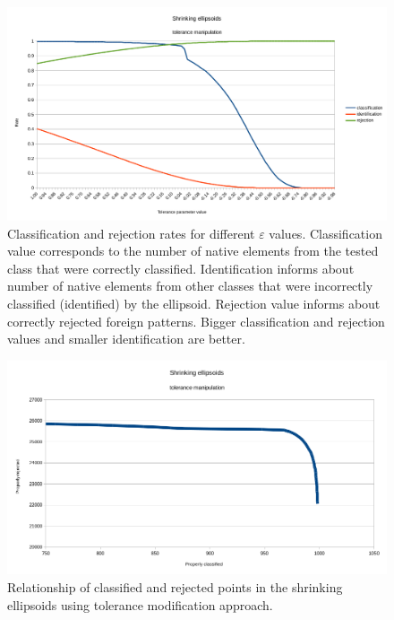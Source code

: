 \begin{figure}[htp]
	\centering
	\includegraphics[width=1.\textwidth]{Figures/shrinking_ellipsoid_tolerance_manipulation.png}
	\caption{ Classification and rejection rates for different $\varepsilon$ values. Classification value corresponds to the number of native elements from the tested class that were correctly classified. Identification informs about number of native elements from other classes that were incorrectly classified (identified) by the ellipsoid. Rejection value informs about correctly rejected foreign patterns. Bigger classification and rejection values and smaller identification are better. }
	\label{fig:shrinking_ellipsoids_tolerance_manipulation}\vspace{-3pt}
\end{figure}

\begin{figure}[htp]
\centering
\includegraphics[width=1.\textwidth]{Figures/shrinking_ellipsoid_tolerance_manipulation2.png}
\caption{ Relationship of classified and rejected points in the shrinking ellipsoids using tolerance modification approach. }
\label{fig:shrinking_ellipsoids_tolerance_manipulation2}\vspace{-3pt}
\end{figure}

